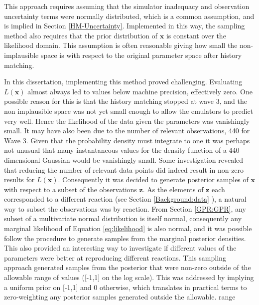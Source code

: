\documentclass[
  12pt,
  a4paper,
  twoside]{book}
\begin{document}
This approach requires assuming that the simulator inadequacy and observation uncertainty terms were normally distributed, which is a common assumption, and is implied in Section \ref{HM-Uncertainty}. Implemented in this way, the sampling method also requires that the prior distribution of \(\mathbf{x}\) is constant over the likelihood domain. This assumption is often reasonable giving how small the non-implausible space is with respect to the original parameter space after history matching.

In this dissertation, implementing this method proved challenging. Evaluating \(L(\mathbf{x})\) almost always led to values below machine precision, effectively zero. One possible reason for this is that the history matching stopped at wave 3, and the non implausible space was not yet small enough to allow the emulators to predict very well. Hence the likelihood of the data given the parameters was vanishingly small. It may have also been due to the number of relevant observations, 440 for Wave 3. Given that the probability density must integrate to one it was perhaps not unusual that many instantaneous values for the density function of a 440-dimensional Gaussian would be vanishingly small. Some investigation revealed that reducing the number of relevant data points did indeed result in non-zero results for \(L(\mathbf{x})\). Consequently it was decided to generate posterior samples of \(\mathbf{x}\) with respect to a subset of the observations \(\mathbf{z}\). As the elements of \(\mathbf{z}\) each corresponded to a different reaction (see Section \ref{Background:data} ), a natural way to subset the observations was by reaction. From Section \ref{GPR:GPR}, any subset of a multivariate normal distribution is itself normal, consequently any marginal likelihood of Equation \eqref{eq:likelihood} is also normal, and it was possible follow the procedure to generate samples from the marginal posterior densities. This also provided an interesting way to investigate if different values of the parameters were better at reproducing different reactions. This sampling approach generated samples from the posterior that were non-zero outside of the allowable range of values ({[}-1,1{]} on the log scale). This was addressed by implying a uniform prior on {[}-1,1{]} and 0 otherwise, which translates in practical terms to zero-weighting any posterior samples generated outside the allowable. range
\end{document}
